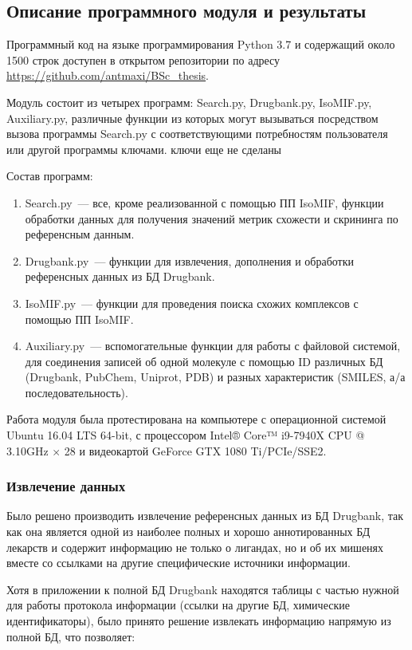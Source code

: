 \documentclass[a4paper,14pt]{article}         %
\begin{document}
\subsection{Описание программного модуля и результаты}
Программный код на языке программирования Python 3.7 \cite{python37} и содержащий около 1500 строк доступен в открытом репозитории по адресу \href{https://github.com/antmaxi/BSc\_thesis}{https://github.com/antmaxi/BSc\_thesis}.

Модуль состоит из четырех программ: Search.py, Drugbank.py, IsoMIF.py, Auxiliary.py, различные функции из которых могут вызываться посредством вызова программы Search.py с соответствующими потребностям пользователя или другой программы ключами. \color{orange} ключи еще не сделаны \color{black}

Состав программ:
\begin{enumerate}
	\item Search.py~--- все, кроме реализованной с помощью ПП IsoMIF, функции обработки данных для получения значений метрик схожести и скрининга по референсным данным.
	\item Drugbank.py~--- функции для извлечения, дополнения и обработки референсных данных из БД Drugbank.
	\item IsoMIF.py~--- функции для проведения поиска схожих комплексов с помощью ПП IsoMIF.
	\item Auxiliary.py~--- вспомогательные функции для работы с файловой системой, для соединения записей об одной молекуле с помощью ID различных БД (Drugbank, PubChem, Uniprot, PDB) и разных характеристик (SMILES, а/а последовательность).
\end{enumerate}

Работа модуля была протестирована на компьютере с операционной системой Ubuntu 16.04 LTS 64-bit, с процессором Intel® Core™ i9-7940X CPU @ 3.10GHz $\times$ 28 и видеокартой GeForce GTX 1080 Ti/PCIe/SSE2.
\subsubsection{Извлечение данных}
Было решено производить извлечение референсных данных из БД Drugbank, так как она является одной из наиболее полных и хорошо аннотированных БД лекарств \cite{Wishart2017} и содержит информацию не только о лигандах, но и об их мишенях вместе со ссылками на другие специфические источники информации. 

Хотя в приложении к полной БД Drugbank находятся таблицы с частью нужной для работы протокола информации (ссылки на другие БД, химические идентификаторы), было принято решение извлекать информацию напрямую из полной БД, что позволяет: 
\end{document}
